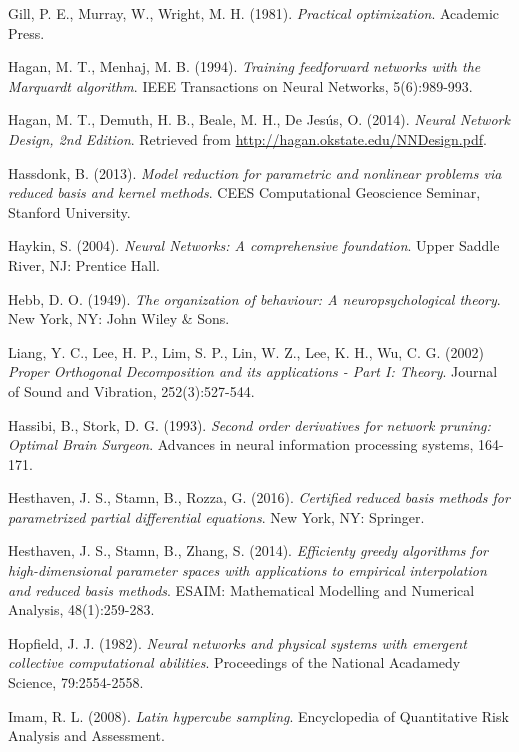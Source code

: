 \documentclass[12pt, a4paper, twoside, openright, notitlepage]{report}
\numberwithin{equation}{chapter}
\theoremstyle{theorem}
\theoremstyle{definition}
\theoremstyle{remark}
\theoremstyle{proposition}
\numberwithin{figure}{chapter}
\begin{document}
\begin{thebibliography}{50}
		Gill, P. E., Murray, W., Wright, M. H. (1981). \emph{Practical optimization}. Academic Press.
		
		Hagan, M. T., Menhaj, M. B. (1994). \emph{Training feedforward networks with the Marquardt algorithm}. IEEE Transactions on Neural Networks, 5(6):989-993.
		
		Hagan, M. T., Demuth, H. B., Beale, M. H., De Jes\'us, O. (2014). \emph{Neural Network Design, 2nd Edition}. Retrieved from \url{http://hagan.okstate.edu/NNDesign.pdf}.
		
		Hassdonk, B. (2013). \emph{Model reduction for parametric and nonlinear problems via reduced basis and kernel methods}. CEES Computational Geoscience Seminar, Stanford University.
		
		Haykin, S. (2004). \emph{Neural Networks: A comprehensive foundation}. Upper Saddle River, NJ: Prentice Hall.
		
		Hebb, D. O. (1949). \emph{The organization of behaviour: A neuropsychological theory}. New York, NY: John Wiley \& Sons. 
		
		Liang, Y. C., Lee, H. P., Lim, S. P., Lin, W. Z., Lee, K. H., Wu, C. G. (2002) \emph{Proper Orthogonal Decomposition and its applications - Part I: Theory}. Journal of Sound and Vibration, 252(3):527-544.
		
		Hassibi, B., Stork, D. G. (1993). \emph{Second order derivatives for network pruning: Optimal Brain Surgeon}. Advances in neural information processing systems, 164-171.
		
		Hesthaven, J. S., Stamn, B., Rozza, G. (2016). \emph{Certified reduced basis methods for parametrized partial differential equations}. New York, NY: Springer.
		
		Hesthaven, J. S., Stamn, B., Zhang, S. (2014). \emph{Efficienty greedy algorithms for high-dimensional parameter spaces with applications to empirical interpolation and reduced basis methods}. ESAIM: Mathematical Modelling and Numerical Analysis, 48(1):259-283.
		
		Hopfield, J. J. (1982). \emph{Neural networks and physical systems with emergent collective computational abilities}. Proceedings of the National Acadamedy Science, 79:2554-2558.
		
		Imam, R. L. (2008). \emph{Latin hypercube sampling}. Encyclopedia of Quantitative Risk Analysis and Assessment.
		

\end{thebibliography}
\end{document}
